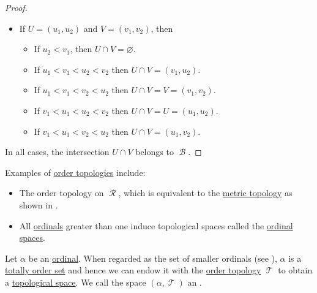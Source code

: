 \begin{proof}
\begin{itemize}
    \item If \( U = (u_1, u_2) \) and \( V = (v_1, v_2) \), then
    \begin{itemize}
      \item If \( u_2 < v_1 \), then \( U \cap V = \varnothing \).
      \item If \( u_1 < v_1 < u_2 < v_2 \) then \( U \cap V = (v_1, u_2) \).
      \item If \( u_1 < v_1 < v_2 < u_2 \) then \( U \cap V = V = (v_1, v_2) \).
      \item If \( v_1 < u_1 < u_2 < v_2 \) then \( U \cap V = U = (u_1, u_2) \).
      \item If \( v_1 < u_1 < v_2 < u_2 \) then \( U \cap V = (u_1, v_2) \).
    \end{itemize}
  \end{itemize}

  In all cases, the intersection \( U \cap V \) belongs to \( \mscrB \).
\end{proof}

\begin{example}\label{ex:def:order_topology}
  Examples of \hyperref[def:order topology]{order topologies} include:
  \begin{itemize}
    \item The order topology on \( \mscrR \), which is equivalent to the \hyperref[def:metric_topology]{metric topology} as shown in .

    \item All \hyperref[def:ordinal]{ordinals} greater than one induce topological spaces called the \hyperref[def:ordinal_space]{ordinal spaces}.
  \end{itemize}
\end{example}

\begin{definition}\label{def:ordinal_space}
  Let \( \alpha \) be an \hyperref[def:ordinal]{ordinal}. When regarded as the set of smaller ordinals (see ), \( \alpha \) is a \hyperref[def:totally_ordered_set]{totally order set} and hence we can endow it with the \hyperref[def:order_topology]{order topology} \( \mscrT \) to obtain a \hyperref[def:topological_space]{topological space}. We call the space \( (\alpha, \mscrT) \) an .
\end{definition}

